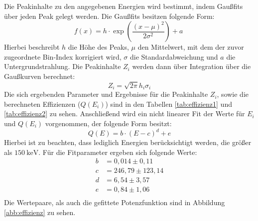 \noindent Die Peakinhalte zu den angegebenen Energien wird bestimmt, indem Gaußfits über jeden Peak gelegt werden. Die Gaußfits besitzen folgende Form:
\begin{equation*}
    f(x) = h \cdot \exp\left(\frac{(x-\mu)^2}{2\sigma^2}\right) +a \;
\end{equation*}
Hierbei beschreibt $h$ die Höhe des Peaks, $\mu$ den Mittelwert, mit dem der zuvor zugeordnete Bin-Index korrigiert wird, $\sigma$ die Standardabweichung und $a$ die Untergrundstrahlung.
Die Peakinhalte $Z_i$ werden dann über Integration über die Gaußkurven berechnet:
\begin{equation*}
    Z_i = \sqrt{2\pi} h_i \sigma_i
\end{equation*}
\FloatBarrier
Die sich ergebenden Parameter und Ergebnisse für die Peakinhalte $Z_i$, sowie die berechneten Effizienzen ($Q(E_i)$) sind in den Tabellen \ref{tab:effizienz1} und \ref{tab:effizienz2} zu sehen.
Anschließend wird ein nicht linearer Fit der Werte für $E_i$ und $Q(E_i)$ vorgenommen, der folgende Form besitzt:
\begin{equation*}
    Q(E) = b \cdot (E-c)^d + e
\end{equation*}
Hierbei ist zu beachten, dass lediglich Energien berücksichtigt werden, die größer als $\SI{150}{\kilo \electronvolt}$.
Für die Fitparameter ergeben sich folgende Werte:
\begin{align*}
    b &= 0,014 \pm 0,11 \\
    c &= 246,79 \pm 123,14 \\
    d &= 6,54 \pm 3,57 \\
    e &= 0,84 \pm 1,06  \\
\end{align*}
Die Wertepaare, als auch die gefittete Potenzfunktion sind in Abbildung \ref{abb:effizienz} zu sehen.

